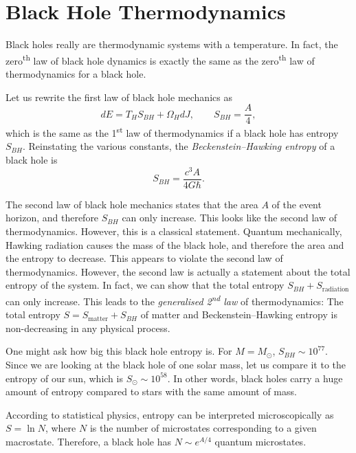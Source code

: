 \section{Black Hole Thermodynamics}%
\label{sec:black_hole_thermodynamics}

Black holes really are thermodynamic systems with a temperature.
In fact, the zero\textsuperscript{th} law of black hole dynamics is exactly the same as the zero\textsuperscript{th} law of thermodynamics for a black hole.

Let us rewrite the first law of black hole mechanics as
\begin{equation}
  d E = T_H S_{BH} + \Omega_H d J, \qquad S_{BH} = \frac{A}{4},
\end{equation}
which is the same as the 1\textsuperscript{st} law of thermodynamics if a black hole has entropy $S_{BH}$. Reinstating the various constants, the \emph{Beckenstein--Hawking entropy} of a black hole is
\begin{equation}
  S_{BH} = \frac{c^3 A}{4 G \hbar}.
\end{equation}

The second law of black hole mechanics states that the area $A$ of the event horizon, and therefore $S_{BH}$ can only increase. This looks like the second law of thermodynamics. 
However, this is a classical statement. Quantum mechanically, Hawking radiation causes the mass of the black hole, and therefore the area and the entropy to decrease.
This appears to violate the second law of thermodynamics. 
However, the second law is actually a statement about the total entropy of the system. In fact, we can show that the total entropy $S_{BH} + S_{\text{radiation}}$ can only increase.
This leads to the \emph{generalised 2\textsuperscript{nd} law} of thermodynamics: The total entropy $S = S_{\text{matter}} + S_{BH}$ of matter and Beckenstein--Hawking entropy is non-decreasing in any physical process. 

One might ask how big this black hole entropy is.
For $M = M_{\odot}$, $S_{BH} \sim 10^{77}$. Since we are looking at the black hole of one solar mass, let us compare it to the entropy of our sun, which is $S_\odot \sim 10^{58}$. In other words, black holes carry a huge amount of entropy compared to stars with the same amount of mass.

According to statistical physics, entropy can be interpreted microscopically as $S = \ln N$, where $N$ is the number of microstates corresponding to a given macrostate.
Therefore, a black hole has $N \sim e^{A / 4}$ quantum microstates.

